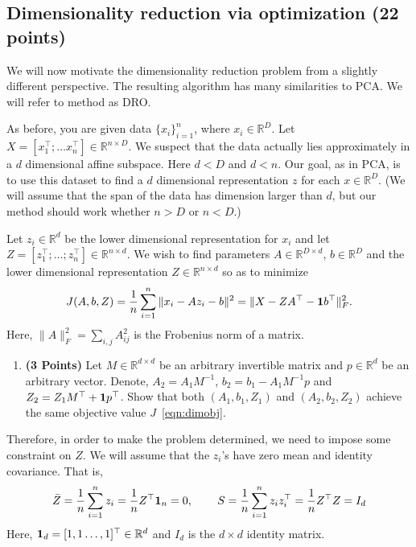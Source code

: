 \documentclass[a4paper]{article}
\newcounter{thm}
\newcommand*{\one}{{\bf 1}}
\newcommand{\Zbar}{\bar{Z}}
\theoremstyle{definition}
\newcommand{\RR}{\mathbb{R}}
\begin{document}
\subsection{Dimensionality reduction via optimization (22 points)}

We will now motivate the dimensionality reduction problem from a slightly different
perspective. The resulting algorithm has many similarities to PCA.
We will refer to method as DRO.

As before, you are given data $\{x_i\}_{i=1}^n$, where $x_i \in \RR^D$. Let $X=[x_1^\top; \dots
x_n^\top] \in \RR^{n\times D}$. We suspect that the data
actually lies approximately in  a $d$ dimensional affine subspace.
Here $d<D$ and $d<n$.
Our goal, as in PCA, is to use this dataset to find a $d$ dimensional representation $z$ for each $x\in\RR^D$.
(We will assume that the span of the data has dimension larger than
$d$, but our method should work whether $n>D$ or $n<D$.)


Let $z_i\in \RR^d$ be the lower dimensional representation for $x_i$ and
let $Z = [z_1^\top; \dots; z_n^\top] \in \RR^{n\times d}$.
We wish to find parameters $A \in \RR^{D\times d}$, $b\in\RR^D$ and the lower
dimensional representation $Z\in \RR^{n\times d}$ so as to minimize 
\begin{equation}
J(A,b,Z) = \frac{1}{n} \sum_{i=1}^n \|x_i - Az_i - b\|^2 = \| X - ZA^\top - \one b^\top\|_F^2.
\label{eqn:dimobj}
\end{equation}
Here, $\|A\|^2_F = \sum_{i,j} A_{ij}^2$ is the Frobenius norm of a matrix.


\begin{enumerate}
\item \textbf{(3 Points)}
Let $M\in\RR^{d\times d}$ be an arbitrary invertible matrix and $p\in\RR^{d}$ be an arbitrary vector.
Denote, $A_2 = A_1M^{-1}$, $b_2 = b_1- A_1M^{-1}p$ and $Z_2 = Z_1 M^\top +
\one p^\top$.
Show that both
$(A_1, b_1, Z_1)$ and $(A_2, b_2, Z_2)$ achieve the same objective value $J$~\eqref{eqn:dimobj}.
\end{enumerate}

Therefore, in order to make the problem determined, we need to impose some
constraint on $Z$. We will assume that the $z_i$'s have zero mean and identity covariance.
That is,
\begin{align*}
\Zbar = \frac{1}{n} \sum_{i=1}^n z_i =\frac{1}{n} Z^\top {\bf 1}_n = 0, \hspace{0.3in} 
S = \frac{1}{n} \sum_{i=1}^n z_i z_i^\top 
= \frac{1}{n} Z^\top Z
= I_d
\end{align*}
Here, ${\bf 1}_d = [1, 1 \dots, 1]^\top \in\RR^d$ and $I_d$  is the $d\times d$ identity matrix.
\end{document}
